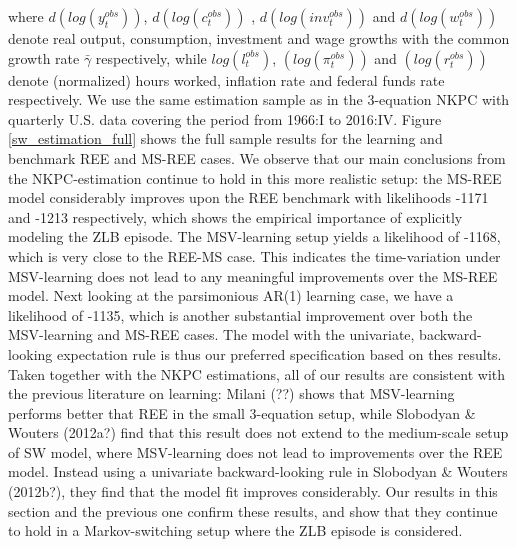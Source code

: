 \documentclass[12pt,reqno]{article}
\numberwithin{equation}{section}
\begin{document}
where $ d( log(y^{obs}_t)) $, $ d(log(c^{obs}_t)) $ , $ d(log({inv}^{obs}_t)) $ and $d(log(w^{obs}_t)) $ denote real output, consumption, investment and wage growths with the common growth rate $\bar{\gamma}$ respectively, while $log(l^{obs}_t)$, $(log(\pi^{obs}_t)) $ and $(log(r^{obs}_t)) $ denote (normalized) hours worked, inflation rate and federal funds rate respectively. We use the same estimation sample as in the 3-equation NKPC with quarterly U.S. data covering the period from 1966:I to 2016:IV. 
 Figure \ref{sw_estimation_full} shows the full sample results for the learning and benchmark REE and MS-REE cases. We observe that our main conclusions from the NKPC-estimation continue to hold in this more realistic setup: the MS-REE model considerably improves upon the REE benchmark with likelihoods -1171 and -1213 respectively, which shows the empirical importance of explicitly modeling the ZLB episode. The MSV-learning setup yields a likelihood of -1168, which is very close to the REE-MS case. This indicates the time-variation under MSV-learning does not lead to any meaningful improvements over the MS-REE model. Next looking at the parsimonious AR(1) learning case, we have a likelihood of -1135, which is another substantial improvement over both the MSV-learning and MS-REE cases. The model with the univariate, backward-looking expectation rule is thus our preferred specification based on thes results. Taken together with the NKPC estimations, all of our results are consistent with the previous literature on learning: Milani (??) shows that MSV-learning performs better that REE in the small 3-equation setup, while Slobodyan \& Wouters (2012a?) find that this result does not extend to the medium-scale setup of SW model, where MSV-learning does not lead to improvements over the REE model. Instead using a univariate backward-looking rule in Slobodyan \& Wouters (2012b?), they find that the model fit improves considerably. Our results in this section and the previous one confirm these results, and show that they continue to hold in a Markov-switching setup where the ZLB episode is considered. \\
\noindent
\end{document}
